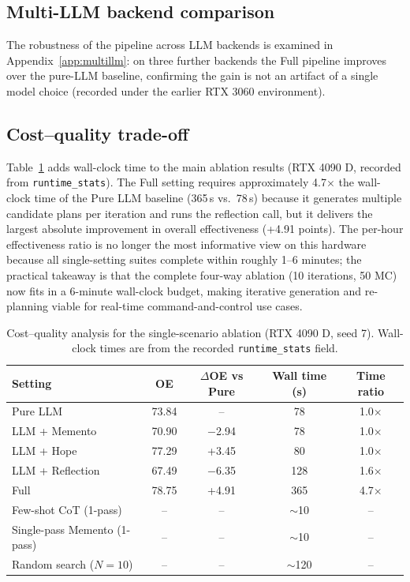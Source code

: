 \subsection{Multi-LLM backend comparison}

The robustness of the pipeline across LLM backends is examined in Appendix~\ref{app:multillm}: on three further backends the Full pipeline improves over the pure-LLM baseline, confirming the gain is not an artifact of a single model choice (recorded under the earlier RTX 3060 environment).

\subsection{Cost--quality trade-off}

Table~\ref{tab:cost-quality} adds wall-clock time to the main ablation results (RTX 4090 D, recorded from \texttt{runtime\_stats}). The Full setting requires approximately 4.7$\times$ the wall-clock time of the Pure LLM baseline (365\,s vs.\ 78\,s) because it generates multiple candidate plans per iteration and runs the reflection call, but it delivers the largest absolute improvement in overall effectiveness (+4.91 points). The per-hour effectiveness ratio is no longer the most informative view on this hardware because all single-setting suites complete within roughly 1--6 minutes; the practical takeaway is that the complete four-way ablation (10 iterations, 50 MC) now fits in a 6-minute wall-clock budget, making iterative generation and re-planning viable for real-time command-and-control use cases.

\begin{table}[ht]
\centering
\caption{Cost--quality analysis for the single-scenario ablation (RTX 4090 D, seed 7). Wall-clock times are from the recorded \texttt{runtime\_stats} field.}
\label{tab:cost-quality}
\footnotesize
\setlength{\tabcolsep}{4.5pt}
\begin{tabular}{lcccc}
\toprule
Setting & OE & $\Delta$OE vs Pure & Wall time (s) & Time ratio \\
\midrule
Pure LLM & 73.84 & -- & 78 & 1.0$\times$ \\
LLM + Memento & 70.90 & $-$2.94 & 78 & 1.0$\times$ \\
LLM + Hope & 77.29 & +3.45 & 80 & 1.0$\times$ \\
LLM + Reflection & 67.49 & $-$6.35 & 128 & 1.6$\times$ \\
Full & 78.75 & +4.91 & 365 & 4.7$\times$ \\
Few-shot CoT (1-pass) & -- & -- & $\sim$10 & -- \\
Single-pass Memento (1-pass) & -- & -- & $\sim$10 & -- \\
Random search ($N{=}10$) & -- & -- & $\sim$120 & -- \\
\bottomrule
\end{tabular}
\end{table}

